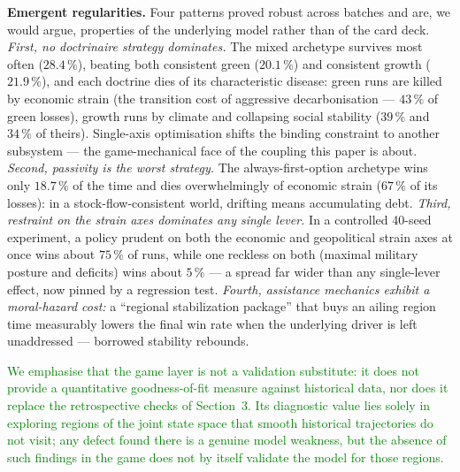 \documentclass[a4paper,fleqn]{cas-sc}
\begin{document}
\textbf{Emergent regularities.} Four patterns proved robust across batches and are, we would
argue, properties of the underlying model rather than of the card deck.
\emph{First, no doctrinaire strategy dominates.} The mixed archetype survives most often
($28.4\,\%$), beating both consistent green ($20.1\,\%$) and consistent growth ($21.9\,\%$), and
each doctrine dies of its characteristic disease: green runs are killed by economic strain (the
transition cost of aggressive decarbonisation --- $43\,\%$ of green losses), growth runs by
climate and collapsing social stability ($39\,\%$ and $34\,\%$ of theirs). Single-axis
optimisation shifts the binding constraint to another subsystem --- the game-mechanical face of
the coupling this paper is about. \emph{Second, passivity is the worst strategy.} The
always-first-option archetype wins only $18.7\,\%$ of the time and dies overwhelmingly of economic
strain ($67\,\%$ of its losses): in a stock-flow-consistent world, drifting means accumulating
debt. \emph{Third, restraint on the strain axes dominates any single lever.} In a controlled
40-seed experiment, a policy prudent on both the economic and geopolitical strain axes at once
wins about $75\,\%$ of runs, while one reckless on both (maximal military posture and deficits)
wins about $5\,\%$ --- a spread far wider than any single-lever effect, now pinned by a regression
test. \emph{Fourth, assistance mechanics exhibit a moral-hazard cost:} a ``regional stabilization
package'' that buys an ailing region time measurably lowers the final win rate when the underlying
driver is left unaddressed --- borrowed stability rebounds.

\textcolor{green}{We emphasise that the game layer is not a validation substitute: it does not provide a quantitative goodness-of-fit measure against historical data, nor does it replace the retrospective checks of Section~3. Its diagnostic value lies solely in exploring regions of the joint state space that smooth historical trajectories do not visit; any defect found there is a genuine model weakness, but the absence of such findings in the game does not by itself validate the model for those regions.}
\end{document}
